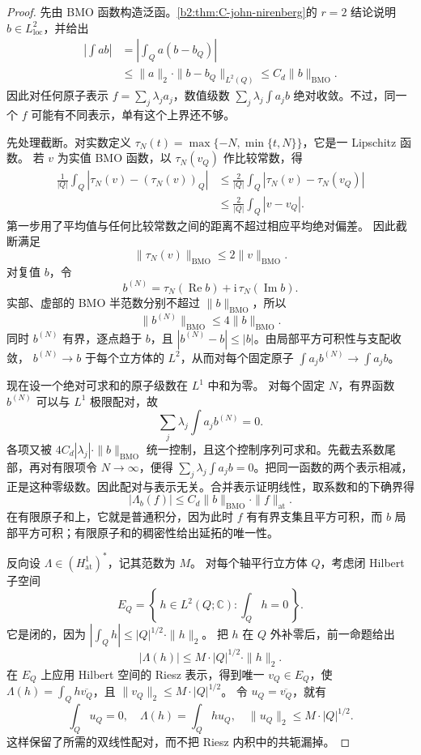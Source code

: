 \begin{proof}
先由 BMO 函数构造泛函。\cref{b2:thm:C-john-nirenberg}的
\(r=2\) 结论说明 \(b\in L^2_{\mathrm{loc}}\)，并给出
\[
\begin{aligned}
 \left|\int ab\right|
 &=\left|\int_Qa(b-b_Q)\right|\\
 &\le\|a\|_2\cdot\|b-b_Q\|_{L^2(Q)}
 \le C_d\|b\|_{\mathrm{BMO}}.
\end{aligned}
\]
因此对任何原子表示 \(f=\sum_j\lambda_ja_j\)，数值级数
\(\sum_j\lambda_j\int a_jb\) 绝对收敛。不过，同一个 \(f\) 可能有不同表示，单有这个上界还不够。

先处理截断。对实数定义
\(\tau_N(t)=\max\{-N,\min\{t,N\}\}\)，它是一 Lipschitz 函数。
若 \(v\) 为实值 BMO 函数，以 \(\tau_N(v_Q)\) 作比较常数，得
\[
\begin{aligned}
 \frac1{|Q|}\int_Q
       |\tau_N(v)-(\tau_N(v))_Q|
 &\le\frac2{|Q|}\int_Q|\tau_N(v)-\tau_N(v_Q)|\\
 &\le\frac2{|Q|}\int_Q|v-v_Q|.
\end{aligned}
\]
第一步用了平均值与任何比较常数之间的距离不超过相应平均绝对偏差。
因此截断满足
\[
 \|\tau_N(v)\|_{\mathrm{BMO}}\le2\|v\|_{\mathrm{BMO}}.
\]
对复值 \(b\)，令
\[
 b^{(N)}=\tau_N(\operatorname{Re}b)
           +\mathrm i\,\tau_N(\operatorname{Im}b).
\]
实部、虚部的 BMO 半范数分别不超过 \(\|b\|_{\mathrm{BMO}}\)，所以
\[
 \|b^{(N)}\|_{\mathrm{BMO}}\le4\|b\|_{\mathrm{BMO}}.
\]
同时 \(b^{(N)}\) 有界，逐点趋于 \(b\)，且
\(|b^{(N)}-b|\le |b|\)。由局部平方可积性与支配收敛，
\(b^{(N)}\to b\) 于每个立方体的 \(L^2\)，从而对每个固定原子
\(\int a_jb^{(N)}\to\int a_jb\)。

现在设一个绝对可求和的原子级数在 \(L^1\) 中和为零。
对每个固定 \(N\)，有界函数 \(b^{(N)}\) 可以与 \(L^1\) 极限配对，故
\[
 \sum_j\lambda_j\int a_jb^{(N)}=0.
\]
各项又被
\(4C_d|\lambda_j|\cdot\|b\|_{\mathrm{BMO}}\) 统一控制，且这个控制序列可求和。先截去系数尾部，再对有限项令 \(N\to\infty\)，便得
\(\sum_j\lambda_j\int a_jb=0\)。把同一函数的两个表示相减，正是这种零级数。因此配对与表示无关。合并表示证明线性，取系数和的下确界得
\[
 |\Lambda_b(f)|\le C_d\|b\|_{\mathrm{BMO}}\cdot\|f\|_{\mathrm{at}}.
\]
在有限原子和上，它就是普通积分，因为此时 \(f\) 有有界支集且平方可积，而 \(b\) 局部平方可积；有限原子和的稠密性给出延拓的唯一性。

反向设 \(\Lambda\in(H^1_{\mathrm{at}})^*\)，记其范数为 \(M\)。
对每个轴平行立方体 \(Q\)，考虑闭 Hilbert 子空间
\[
 E_Q=\left\{\,h\in L^2(Q;\mathbb C):
                   \int_Qh=0\,\right\}.
\]
它是闭的，因为 \(\left|\int_Qh\right|\le |Q|^{1/2}\cdot\|h\|_2\)。
把 \(h\) 在 \(Q\) 外补零后，前一命题给出
\[
 |\Lambda(h)|\le M\cdot|Q|^{1/2}\cdot\|h\|_2.
\]
在 \(E_Q\) 上应用 Hilbert 空间的 Riesz 表示，得到唯一
\(v_Q\in E_Q\)，使
\(\Lambda(h)=\int_Qh\overline{v_Q}\)，且
\(\|v_Q\|_2\le M\cdot|Q|^{1/2}\)。
令 \(u_Q=\overline{v_Q}\)，就有
\[
 \int_Qu_Q=0,\quad
 \Lambda(h)=\int_Qhu_Q,\quad
 \|u_Q\|_2\le M\cdot|Q|^{1/2}.
\]
这样保留了所需的双线性配对，而不把 Riesz 内积中的共轭漏掉。


\end{proof}
